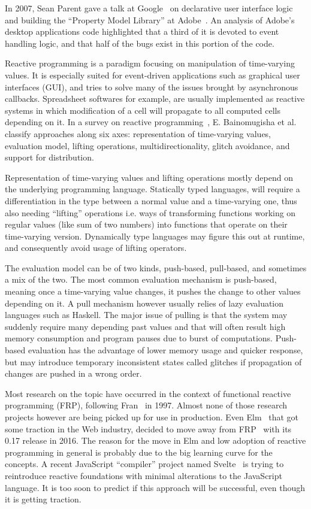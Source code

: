In 2007, Sean Parent gave a talk at Google~\cite{parent2007talk, parent2007pdf}
on declarative user interface logic and building
the ``Property Model Library'' at Adobe~\cite{jarvi2008property}.
An analysis of Adobe's desktop applications code highlighted that a third of it
is devoted to event handling logic,
and that half of the bugs exist in this portion of the code.

Reactive programming is a paradigm focusing on manipulation of time-varying values.
It is especially suited for event-driven applications such as graphical user interfaces (GUI),
and tries to solve many of the issues brought by asynchronous callbacks.
Spreadsheet softwares for example, are usually implemented as reactive systems
in which modification of a cell will propagate to all computed cells depending on it.
In a survey on reactive programming~\cite{bainomugisha2013survey},
E. Bainomugisha et al. classify approaches along six axes:
representation of time-varying values, evaluation model, lifting operations,
multidirectionality, glitch avoidance, and support for distribution.

Representation of time-varying values and lifting operations
mostly depend on the underlying programming language.
Statically typed languages, will require a differentiation in the type
between a normal value and a time-varying one,
thus also needing ``lifting'' operations i.e. ways of transforming
functions working on regular values (like sum of two numbers)
into functions that operate on their time-varying version.
Dynamically type languages may figure this out at runtime,
and consequently avoid usage of lifting operators.

The evaluation model can be of two kinds,
push-based, pull-based, and sometimes a mix of the two.
The most common evaluation mechanism is push-based,
meaning once a time-varying value changes,
it pushes the change to other values depending on it.
A pull mechanism however usually relies of lazy evaluation languages such as Haskell.
The major issue of pulling is that the system may suddenly
require many depending past values and that will often result high memory consumption
and program pauses due to burst of computations.
Push-based evaluation has the advantage of lower memory usage
and quicker response, but may introduce temporary inconsistent states called glitches
if propagation of changes are pushed in a wrong order.

Most research on the topic have occurred in the context
of functional reactive programming (FRP), following Fran~\cite{elliott1997functional} in 1997.
Almost none of those research projects however are being
picked up for use in production.
Even Elm~\cite{czaplicki2013asynchronous} that got some traction in the Web industry,
decided to move away from FRP~\cite{elm017farewell} with its 0.17 release in 2016.
The reason for the move in Elm and low adoption of reactive programming in general
is probably due to the big learning curve for the concepts.
A recent JavaScript ``compiler'' project named Svelte~\cite{harrissvelte}
is trying to reintroduce reactive foundations with minimal alterations
to the JavaScript language.
It is too soon to predict if this approach will be successful,
even though it is getting traction.

